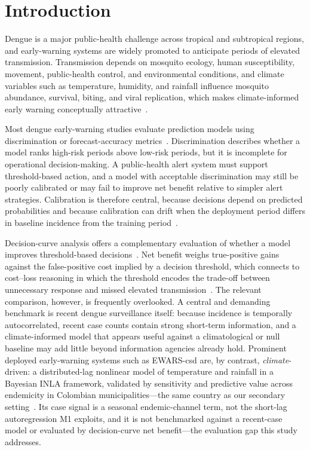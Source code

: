 \documentclass[11pt,a4paper]{article}
\begin{document}
\section{Introduction}

Dengue is a major public-health challenge across tropical and subtropical regions, and early-warning systems are widely promoted to anticipate periods of elevated transmission. Transmission depends on mosquito ecology, human susceptibility, movement, public-health control, and environmental conditions, and climate variables such as temperature, humidity, and rainfall influence mosquito abundance, survival, biting, and viral replication, which makes climate-informed early warning conceptually attractive~\cite{Mordecai2017,Huber2018}.

Most dengue early-warning studies evaluate prediction models using discrimination or forecast-accuracy metrics~\cite{Johansson2019,Baharom2022,HussainAlkhateeb2021,Lowe2021}. Discrimination describes whether a model ranks high-risk periods above low-risk periods, but it is incomplete for operational decision-making. A public-health alert system must support threshold-based action, and a model with acceptable discrimination may still be poorly calibrated or may fail to improve net benefit relative to simpler alert strategies. Calibration is therefore central, because decisions depend on predicted probabilities and because calibration can drift when the deployment period differs in baseline incidence from the training period~\cite{VanCalster2019,VanCalster2023,SteyerbergVergouwe2014}.

Decision-curve analysis offers a complementary evaluation of whether a model improves threshold-based decisions~\cite{Vickers2006,Vickers2016,Vickers2019}. Net benefit weighs true-positive gains against the false-positive cost implied by a decision threshold, which connects to cost--loss reasoning in which the threshold encodes the trade-off between unnecessary response and missed elevated transmission~\cite{Murphy1985,Tozan2023}. The relevant comparison, however, is frequently overlooked. A central and demanding benchmark is recent dengue surveillance itself: because incidence is temporally autocorrelated, recent case counts contain strong short-term information, and a climate-informed model that appears useful against a climatological or null baseline may add little beyond information agencies already hold. Prominent deployed early-warning systems such as EWARS-csd are, by contrast, \emph{climate}-driven: a distributed-lag nonlinear model of temperature and rainfall in a Bayesian INLA framework, validated by sensitivity and predictive value across endemicity in Colombian municipalities---the same country as our secondary setting~\cite{EWARScsd}. Its case signal is a seasonal endemic-channel term, not the short-lag autoregression M1 exploits, and it is not benchmarked against a recent-case model or evaluated by decision-curve net benefit---the evaluation gap this study addresses.
\end{document}
